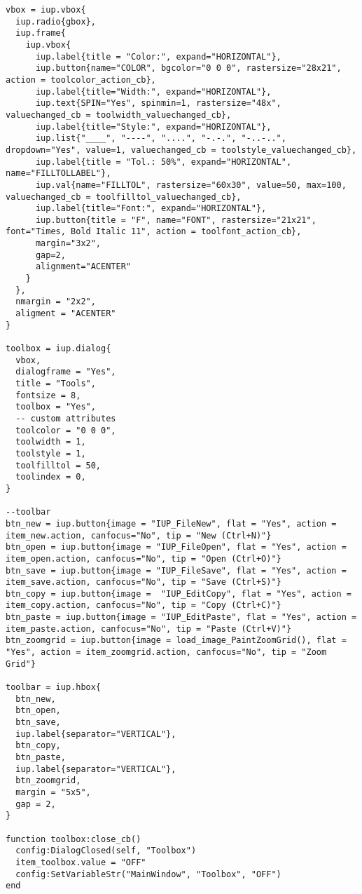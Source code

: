 \documentclass{ctexart}
\begin{document}
\begin{lstlisting}
vbox = iup.vbox{
  iup.radio{gbox},
  iup.frame{
    iup.vbox{
      iup.label{title = "Color:", expand="HORIZONTAL"},
      iup.button{name="COLOR", bgcolor="0 0 0", rastersize="28x21", action = toolcolor_action_cb},
      iup.label{title="Width:", expand="HORIZONTAL"},
      iup.text{SPIN="Yes", spinmin=1, rastersize="48x", valuechanged_cb = toolwidth_valuechanged_cb},
      iup.label{title="Style:", expand="HORIZONTAL"},
      iup.list{"____", "----", "....", "-.-.", "-..-..", dropdown="Yes", value=1, valuechanged_cb = toolstyle_valuechanged_cb},
      iup.label{title = "Tol.: 50%", expand="HORIZONTAL", name="FILLTOLLABEL"},
      iup.val{name="FILLTOL", rastersize="60x30", value=50, max=100, valuechanged_cb = toolfilltol_valuechanged_cb},
      iup.label{title="Font:", expand="HORIZONTAL"},
      iup.button{title = "F", name="FONT", rastersize="21x21", font="Times, Bold Italic 11", action = toolfont_action_cb},
      margin="3x2", 
      gap=2, 
      alignment="ACENTER"
    }
  }, 
  nmargin = "2x2",
  aligment = "ACENTER"
}

toolbox = iup.dialog{
  vbox,
  dialogframe = "Yes",
  title = "Tools",
  fontsize = 8,
  toolbox = "Yes",
  -- custom attributes
  toolcolor = "0 0 0",
  toolwidth = 1,
  toolstyle = 1,
  toolfilltol = 50,
  toolindex = 0,
}

--toolbar
btn_new = iup.button{image = "IUP_FileNew", flat = "Yes", action = item_new.action, canfocus="No", tip = "New (Ctrl+N)"}
btn_open = iup.button{image = "IUP_FileOpen", flat = "Yes", action = item_open.action, canfocus="No", tip = "Open (Ctrl+O)"}
btn_save = iup.button{image = "IUP_FileSave", flat = "Yes", action = item_save.action, canfocus="No", tip = "Save (Ctrl+S)"}
btn_copy = iup.button{image =  "IUP_EditCopy", flat = "Yes", action = item_copy.action, canfocus="No", tip = "Copy (Ctrl+C)"}
btn_paste = iup.button{image = "IUP_EditPaste", flat = "Yes", action = item_paste.action, canfocus="No", tip = "Paste (Ctrl+V)"}
btn_zoomgrid = iup.button{image = load_image_PaintZoomGrid(), flat = "Yes", action = item_zoomgrid.action, canfocus="No", tip = "Zoom Grid"}

toolbar = iup.hbox{
  btn_new,
  btn_open,
  btn_save,
  iup.label{separator="VERTICAL"},
  btn_copy,
  btn_paste,
  iup.label{separator="VERTICAL"},
  btn_zoomgrid,
  margin = "5x5",
  gap = 2,
}

function toolbox:close_cb()
  config:DialogClosed(self, "Toolbox")
  item_toolbox.value = "OFF"
  config:SetVariableStr("MainWindow", "Toolbox", "OFF")
end


\end{lstlisting}
\end{document}
